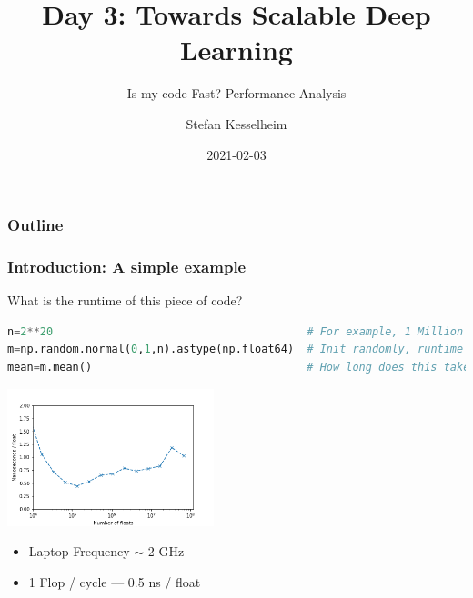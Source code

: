 \documentclass[t, 10pt, aspectratio=1610]{beamer}
\author[S. Kesselheim]{Stefan Kesselheim}
\institute[JSC]{Helmholtz AI @ JSC}
\date{2021-02-03}
\title{Day 3: Towards Scalable Deep Learning}
\subtitle{Is my code Fast? Performance Analysis}
\begin{document}


\maketitle
\begin{frame}
  \frametitle{Outline}
  \tableofcontents
\end{frame}

\begin{frame}[fragile]

\frametitle{Introduction: A simple example}

What is the runtime of this piece of code?

\begin{lstlisting}[language=Python]
n=2**20                                       # For example, 1 Million Floats
m=np.random.normal(0,1,n).astype(np.float64)  # Init randomly, runtime irrelevant
mean=m.mean()                                 # How long does this take?
\end{lstlisting}

 \begin{center}
\includegraphics[width=6cm]{nanoseconds per float.png}     
 \end{center}

\begin{itemize}
    \item Laptop Frequency $\sim$ 2 GHz
    \item 1 Flop / cycle --- 0.5 ns / float
\end{itemize}

\end{frame}
\end{document}
